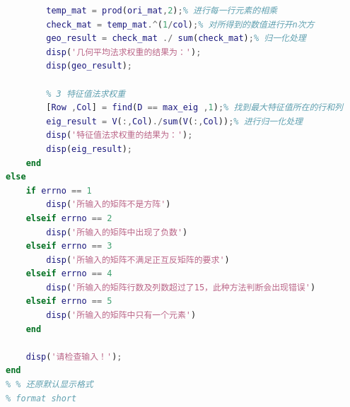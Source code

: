 \documentclass[a4paper]{article}
\begin{document}
\begin{lstlisting}[language = matlab,keywordstyle=\color{blue!70}, commentstyle=\color{red!50!green!50!blue!50}, basicstyle=\tiny]
        % 2 几何平均法求权重
        temp_mat = prod(ori_mat,2);% 进行每一行元素的相乘
        check_mat = temp_mat.^(1/col);% 对所得到的数值进行开n次方
        geo_result = check_mat ./ sum(check_mat);% 归一化处理
        disp('几何平均法求权重的结果为：');
        disp(geo_result);
        
        % 3 特征值法求权重
        [Row ,Col] = find(D == max_eig ,1);% 找到最大特征值所在的行和列
        eig_result = V(:,Col)./sum(V(:,Col));% 进行归一化处理
        disp('特征值法求权重的结果为：');
        disp(eig_result);
    end
else
    if errno == 1
        disp('所输入的矩阵不是方阵')
    elseif errno == 2
        disp('所输入的矩阵中出现了负数')
    elseif errno == 3
        disp('所输入的矩阵不满足正互反矩阵的要求')
    elseif errno == 4
        disp('所输入的矩阵行数及列数超过了15，此种方法判断会出现错误')
    elseif errno == 5
        disp('所输入的矩阵中只有一个元素')
    end
    
    disp('请检查输入！');
end
% % 还原默认显示格式
% format short
        \end{lstlisting}
\end{document}
